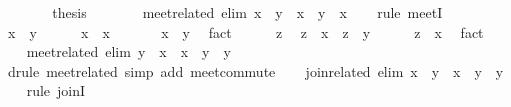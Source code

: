 \begin{isabellebody}
\ \ \ \ \isamarkupfalse%
\ \isamarkupfalse%
\ {\isacharquery}thesis\ \isacommand{{\isachardot}}\isamarkupfalse%
\isanewline
\ \ \isamarkupfalse%
\isanewline
\isanewline
\ \ \isamarkupfalse%
\ meet{\isacharunderscore}related\ {\isacharbrackleft}elim{\isacharquery}{\isacharbrackright}{\isacharcolon}\ {\isachardoublequoteopen}x\ {\isasymsqsubseteq}\ y\ {\isasymLongrightarrow}\ x\ {\isasymsqinter}\ y\ {\isacharequal}\ x{\isachardoublequoteclose}\isanewline
\ \ \isamarkupfalse%
\ {\isacharparenleft}rule\ meetI{\isacharparenright}\isanewline
\ \ \ \ \isamarkupfalse%
\ {\isachardoublequoteopen}x\ {\isasymsqsubseteq}\ y{\isachardoublequoteclose}\isanewline
\ \ \ \ \isamarkupfalse%
\ {\isachardoublequoteopen}x\ {\isasymsqsubseteq}\ x{\isachardoublequoteclose}\ \isacommand{{\isachardot}{\isachardot}}\isamarkupfalse%
\isanewline
\ \ \ \ \isamarkupfalse%
\ {\isachardoublequoteopen}x\ {\isasymsqsubseteq}\ y{\isachardoublequoteclose}\ \isamarkupfalse%
\ fact\isanewline
\ \ \ \ \isamarkupfalse%
\ z\ \isamarkupfalse%
\ {\isachardoublequoteopen}z\ {\isasymsqsubseteq}\ x{\isachardoublequoteclose}\ \ {\isachardoublequoteopen}z\ {\isasymsqsubseteq}\ y{\isachardoublequoteclose}\isanewline
\ \ \ \ \isamarkupfalse%
\ {\isachardoublequoteopen}z\ {\isasymsqsubseteq}\ x{\isachardoublequoteclose}\ \isamarkupfalse%
\ fact\isanewline
\ \ \isamarkupfalse%
\isanewline
\isanewline
\ \ \isamarkupfalse%
\ meet{\isacharunderscore}related{}\ {\isacharbrackleft}elim{\isacharquery}{\isacharbrackright}{\isacharcolon}\ {\isachardoublequoteopen}y\ {\isasymsqsubseteq}\ x\ {\isasymLongrightarrow}\ x\ {\isasymsqinter}\ y\ {\isacharequal}\ y{\isachardoublequoteclose}\isanewline
\ \ \ \ \isamarkupfalse%
\ {\isacharparenleft}drule\ meet{\isacharunderscore}related{\isacharparenright}\ {\isacharparenleft}simp\ add{\isacharcolon}\ meet{\isacharunderscore}commute{\isacharparenright}\isanewline
\isanewline
\ \ \isamarkupfalse%
\ join{\isacharunderscore}related\ {\isacharbrackleft}elim{\isacharquery}{\isacharbrackright}{\isacharcolon}\ {\isachardoublequoteopen}x\ {\isasymsqsubseteq}\ y\ {\isasymLongrightarrow}\ x\ {\isasymsqunion}\ y\ {\isacharequal}\ y{\isachardoublequoteclose}\isanewline
\ \ \isamarkupfalse%
\ {\isacharparenleft}rule\ joinI{\isacharparenright}\isanewline

\end{isabellebody}
